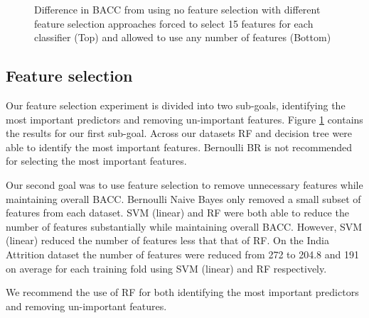 \documentclass{sig-alternate-05-2015}
\begin{document}
	\begin{figure}
		\vspace{-5em}
		\centering
		\caption{Difference in BACC from using no feature selection with different feature selection approaches forced to select 15 features for each classifier (Top) and allowed to use any number of features (Bottom)}
		\label{fig:feature_selection_limit_15}
	\end{figure}
	
	\subsection{Feature selection}
	Our feature selection experiment is divided into two sub-goals, identifying the most important predictors and removing un-important features. Figure \ref{fig:feature_selection_limit_15} contains the results for our first sub-goal. Across our datasets RF and decision tree were able to identify the most important features. Bernoulli BR is not recommended for selecting the most important features.
	
	Our second goal was to use feature selection to remove unnecessary features while maintaining overall BACC. Bernoulli Naive Bayes only removed a small subset of features from each dataset. SVM (linear) and RF were both able to reduce the number of features substantially while maintaining overall BACC. However, SVM (linear) reduced the number of features less that that of RF. On the India Attrition dataset the number of features were reduced from 272 to 204.8 and 191 on average for each training fold using SVM (linear) and RF respectively.
	
	We recommend the use of RF for both identifying the most important predictors and removing un-important features.
	
\end{document}
